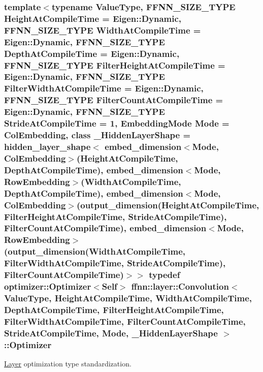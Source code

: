 \hypertarget{classffnn_1_1layer_1_1_convolution_a4f65a386b5e7803b1413b546215cefa3}{
\subsubsection[{Optimizer}]{\setlength{\rightskip}{0pt plus 5cm}template$<$typename Value\-Type, F\-F\-N\-N\-\_\-\-S\-I\-Z\-E\-\_\-\-T\-Y\-P\-E Height\-At\-Compile\-Time = Eigen\-::\-Dynamic, F\-F\-N\-N\-\_\-\-S\-I\-Z\-E\-\_\-\-T\-Y\-P\-E Width\-At\-Compile\-Time = Eigen\-::\-Dynamic, F\-F\-N\-N\-\_\-\-S\-I\-Z\-E\-\_\-\-T\-Y\-P\-E Depth\-At\-Compile\-Time = Eigen\-::\-Dynamic, F\-F\-N\-N\-\_\-\-S\-I\-Z\-E\-\_\-\-T\-Y\-P\-E Filter\-Height\-At\-Compile\-Time = Eigen\-::\-Dynamic, F\-F\-N\-N\-\_\-\-S\-I\-Z\-E\-\_\-\-T\-Y\-P\-E Filter\-Width\-At\-Compile\-Time = Eigen\-::\-Dynamic, F\-F\-N\-N\-\_\-\-S\-I\-Z\-E\-\_\-\-T\-Y\-P\-E Filter\-Count\-At\-Compile\-Time = Eigen\-::\-Dynamic, F\-F\-N\-N\-\_\-\-S\-I\-Z\-E\-\_\-\-T\-Y\-P\-E Stride\-At\-Compile\-Time = 1, Embedding\-Mode Mode = Col\-Embedding, class \-\_\-\-Hidden\-Layer\-Shape = hidden\-\_\-layer\-\_\-shape$<$              embed\-\_\-dimension$<$\-Mode, Col\-Embedding$>$(\-Height\-At\-Compile\-Time, Depth\-At\-Compile\-Time),              embed\-\_\-dimension$<$\-Mode, Row\-Embedding$>$(\-Width\-At\-Compile\-Time,  Depth\-At\-Compile\-Time),              embed\-\_\-dimension$<$\-Mode, Col\-Embedding$>$(output\-\_\-dimension(\-Height\-At\-Compile\-Time, Filter\-Height\-At\-Compile\-Time, Stride\-At\-Compile\-Time), Filter\-Count\-At\-Compile\-Time),              embed\-\_\-dimension$<$\-Mode, Row\-Embedding$>$(output\-\_\-dimension(\-Width\-At\-Compile\-Time,  Filter\-Width\-At\-Compile\-Time,  Stride\-At\-Compile\-Time), Filter\-Count\-At\-Compile\-Time)$>$$>$ typedef {\bf optimizer\-::\-Optimizer}$<${\bf Self}$>$ {\bf ffnn\-::layer\-::\-Convolution}$<$ Value\-Type, Height\-At\-Compile\-Time, Width\-At\-Compile\-Time, Depth\-At\-Compile\-Time, Filter\-Height\-At\-Compile\-Time, Filter\-Width\-At\-Compile\-Time, Filter\-Count\-At\-Compile\-Time, Stride\-At\-Compile\-Time, Mode, \-\_\-\-Hidden\-Layer\-Shape $>$\-::{\bf Optimizer}}}\label{classffnn_1_1layer_1_1_convolution_a4f65a386b5e7803b1413b546215cefa3}


\hyperlink{classffnn_1_1layer_1_1_layer}{Layer} optimization type standardization. 


